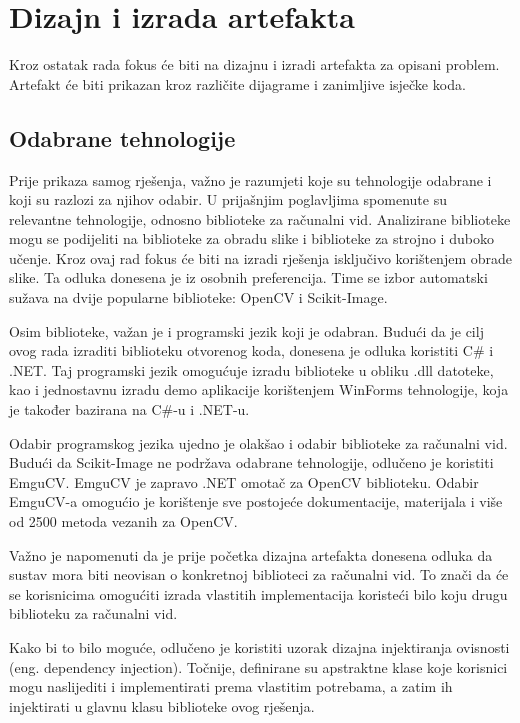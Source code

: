 \documentclass{foi}
\begin{document}
\chapter{Dizajn i izrada artefakta}

Kroz ostatak rada fokus će biti na dizajnu i izradi artefakta za opisani problem. Artefakt će biti prikazan kroz različite dijagrame i zanimljive isječke koda.

\section{Odabrane tehnologije}

Prije prikaza samog rješenja, važno je razumjeti koje su tehnologije odabrane i koji su razlozi za njihov odabir. U prijašnjim poglavljima spomenute su relevantne tehnologije, odnosno biblioteke za računalni vid. Analizirane biblioteke mogu se podijeliti na biblioteke za obradu slike i biblioteke za strojno i duboko učenje. Kroz ovaj rad fokus će biti na izradi rješenja isključivo korištenjem obrade slike. Ta odluka donesena je iz osobnih preferencija. Time se izbor automatski sužava na dvije popularne biblioteke: OpenCV i Scikit-Image.

Osim biblioteke, važan je i programski jezik koji je odabran. Budući da je cilj ovog rada izraditi biblioteku otvorenog koda, donesena je odluka koristiti C\# i .NET. Taj programski jezik omogućuje izradu biblioteke u obliku .dll datoteke, kao i jednostavnu izradu demo aplikacije korištenjem WinForms tehnologije, koja je također bazirana na C\#-u i .NET-u.

Odabir programskog jezika ujedno je olakšao i odabir biblioteke za računalni vid. Budući da Scikit-Image ne podržava odabrane tehnologije, odlučeno je koristiti EmguCV. EmguCV je zapravo .NET omotač za OpenCV biblioteku. Odabir EmguCV-a omogućio je korištenje sve postojeće dokumentacije, materijala i više od 2500 metoda vezanih za OpenCV.

Važno je napomenuti da je prije početka dizajna artefakta donesena odluka da sustav mora biti neovisan o konkretnoj biblioteci za računalni vid. To znači da će se korisnicima omogućiti izrada vlastitih implementacija koristeći bilo koju drugu biblioteku za računalni vid.

Kako bi to bilo moguće, odlučeno je koristiti uzorak dizajna injektiranja ovisnosti (eng. dependency injection). Točnije, definirane su apstraktne klase koje korisnici mogu naslijediti i implementirati prema vlastitim potrebama, a zatim ih injektirati u glavnu klasu biblioteke ovog rješenja.
\end{document}
